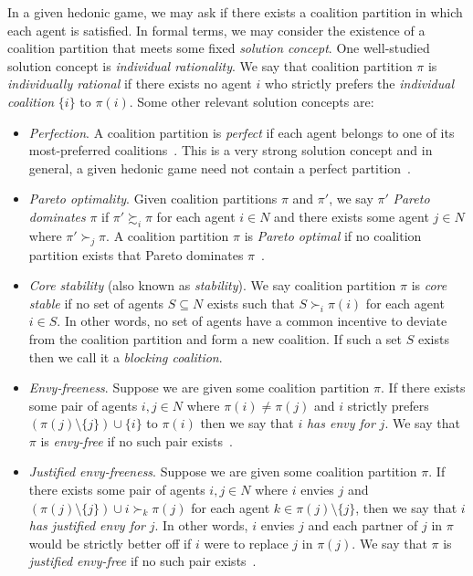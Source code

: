 In a given hedonic game, we may ask if there exists a coalition partition in which each agent is satisfied. In formal terms, we may consider the existence of a coalition partition that meets some fixed \emph{solution concept}. One well-studied solution concept is \emph{individual rationality}. We say that coalition partition $\pi$ is \emph{individually rational} if there exists no agent $i$ who strictly prefers the \emph{individual coalition} $\{i\}$ to $\pi(i)$. Some other relevant solution concepts are:
\begin{itemize}
    \item \emph{Perfection}. A coalition partition is \emph{perfect} if each agent belongs to one of its most-preferred coalitions~\cite{ABH11}. This is a very strong solution concept and in general, a given hedonic game need not contain a perfect partition~\cite{HedonicGamesHOCSC}.
    \item \emph{Pareto optimality}. Given coalition partitions $\pi$ and $\pi'$, we say $\pi'$ \textit{Pareto dominates} $\pi$ if $\pi' \succsim_i \pi$ for each agent $i \in N$ and there exists some agent $j\in N$ where $\pi' \succ_j \pi$. A coalition partition $\pi$ is \textit{Pareto optimal} if no coalition partition exists that Pareto dominates $\pi$~\cite{AzizLang2016}.
    \item \emph{Core stability} (also known as \emph{stability}). We say coalition partition $\pi$ is \emph{core stable} if no set of agents $S\subseteq N$ exists such that $S \succ_i \pi(i)$ for each agent $i \in S$. In other words, no set of agents have a common incentive to deviate from the coalition partition and form a new coalition. If such a set $S$ exists then we call it a \emph{blocking coalition}.
    \item \emph{Envy-freeness}. Suppose we are given some coalition partition $\pi$. If there exists some pair of agents $i, j \in N$ where $\pi(i) \neq \pi(j)$ and $i$ strictly prefers $(\pi(j) \setminus \{ j \}) \cup \{ i \}$ to $\pi(i)$ then we say that $i$ \emph{has envy for} $j$. We say that $\pi$ is \emph{envy-free} if no such pair exists~\cite{AZIZ2013316}.
    \item \emph{Justified envy-freeness}. Suppose we are given some coalition partition $\pi$. If there exists some pair of agents $i, j \in N$ where $i$ envies $j$ and $(\pi(j) \setminus \{ j \}) \cup i \succ_k  \pi(j)$ for each agent $k \in \pi(j) \setminus \{ j \}$, then we say that $i$ \emph{has justified envy for} $j$. In other words, $i$ envies $j$ and each partner of $j$ in $\pi$ would be strictly better off if $i$ were to replace $j$ in $\pi(j)$. We say that $\pi$ is \emph{justified envy-free} if no such pair exists~\cite{BY19}.

\end{itemize}

